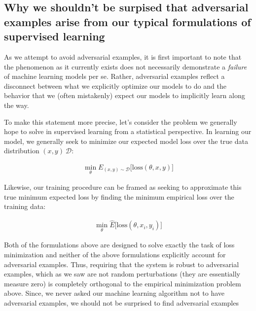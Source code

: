 \documentclass[10pt]{article}
\begin{document}
\subsection{Why we shouldn't be surpised that adversarial examples arise from our typical formulations of supervised learning }

As we attempt to avoid adversarial examples, it is first important to note that the phenomenon as it currently exists does not necessarily demonstrate a \textit{failure} of machine learning models per se. Rather, adversarial examples reflect a disconnect between what we explicitly optimize our models to do and the behavior that we (often mistakenly) expect our models to implicitly learn along the way.

To make this statement more precise, let's consider the problem we generally hope to solve in supervised learning from a statistical perspective. In learning our model, we generally seek to minimize our expected model loss over the true data distribution $(x,y)~\mathcal{D}$:

\begin{align*}
\min_{\theta} E_{(x,y) \sim \mathcal{D}} \big[\text{loss}(\theta, x, y) \big] 
\end{align*}

Likewise, our training procedure can be framed as seeking to approximate this true minimum expected loss by finding the minimum empirical loss over the training data:

\begin{align*}
\min_{\theta} \hat{E} \big[\text{loss}(\theta, x_i, y_i) \big] 
\end{align*}

Both of the formulations above are designed to solve exactly the task of loss minimization and neither of the above formulations explicitly account for adversarial examples. Thus, requiring that the system is robust to adversarial examples, which as we saw are not random perturbations (they are essentially measure zero) is completely orthogonal to the empirical minimization problem above. Since, we never asked our machine learning algorithm not to have adversarial examples, we should not be surprised to find adversarial examples

\end{document}
